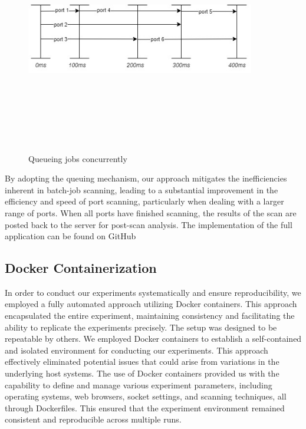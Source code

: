 \begin{figure}[htbp]
    \centering
\includegraphics[width=10cm, height=10cm, keepaspectratio]{port_scanning_techniques/img/queue-job.jpg}
    \caption{Queueing jobs concurrently}
    \label{fig:queue-job}
\end{figure}

By adopting the queuing mechanism, our approach mitigates the inefficiencies inherent in batch-job scanning, leading to a substantial improvement in the efficiency and speed of port scanning, particularly when dealing with a larger range of ports.
When all ports have finished scanning, the results of the scan are posted back to the server for post-scan analysis. The implementation of the full application can be found on GitHub~

\subsection{Docker Containerization}
\label{section:experiment-setup}

In order to conduct our experiments systematically and ensure reproducibility, we employed a fully automated approach utilizing Docker containers. 
This approach encapsulated the entire experiment, maintaining consistency and facilitating the ability to replicate the experiments precisely. 
The setup was designed to be repeatable by others.
We employed Docker containers to establish a self-contained and isolated environment for conducting our experiments. This approach effectively eliminated potential issues that could arise from variations in the underlying host systems.
The use of Docker containers provided us with the capability to define and manage various experiment parameters, including operating systems, web browsers, socket settings, and scanning techniques, all through Dockerfiles. This ensured that the experiment environment remained consistent and reproducible across multiple runs.

